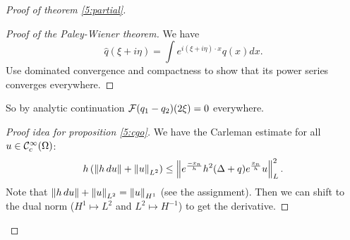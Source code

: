 \begin{proof}[Proof of theorem \ref{5:partial}]
  \begin{proof}[Proof of the Paley-Wiener theorem]
    We have
    \[ \hat q(\xi+i\eta) = \int e^{i(\xi+i\eta)\cdot x} q(x) dx. \]
    Use dominated convergence and compactness to show that its power series converges everywhere.
  \end{proof}

  So by analytic continuation $\mathcal{F}(q_1-q_2)(2\xi)=0$ everywhere.

  \begin{proof}[Proof idea for proposition \ref{5:cgo}]
    We have the Carleman estimate for all $u \in \mathcal{C}_c^\infty(\Omega)$:
    \[ h \left( \left\lVert h \, du \right\rVert + \left\lVert u \right\rVert_{L^2} \right) \leq \left\lVert e^\frac{-x_n}h h^2 (\Delta+q) e^\frac{x_n}h u \right\rVert_L^2. \]
    Note that $\left\lVert h\, du \right\rVert + \left\lVert u \right\rVert_{L^2} = \left\lVert u \right\rVert_{H^1}$ (see the assignment).
    Then we can shift to the dual norm ($H^1 \mapsto L^2$ and $L^2 \mapsto H^{-1}$) to get the derivative.
  \end{proof}
\end{proof}
